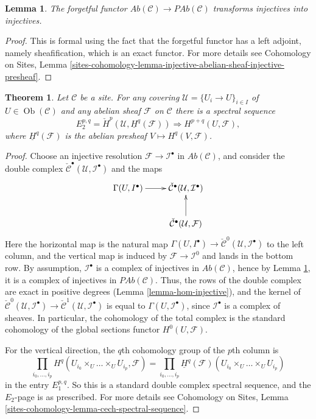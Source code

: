 \documentclass[10pt,a4paper]{amsart}
\theoremstyle{plain}
\newtheorem{theorem}[subsection]{Theorem}
\newtheorem{lemma}[subsection]{Lemma}
\theoremstyle{definition}
\theoremstyle{remark}
\numberwithin{equation}{subsection}
\def\Ob{\mathop{\mathrm{Ob}}\nolimits}
\begin{document}
\begin{lemma}
\label{lemma-forget-injectives}
The forgetful functor $\textit{Ab}(\mathcal{C})\to \textit{PAb}(\mathcal{C})$
transforms injectives into injectives.
\end{lemma}

\begin{proof}
This is formal using the fact that the forgetful functor has a left adjoint,
namely sheafification, which is an exact functor. For more details see
Cohomology on Sites,
Lemma \ref{sites-cohomology-lemma-injective-abelian-sheaf-injective-presheaf}.
\end{proof}

\begin{theorem}
\label{theorem-cech-ss}
Let $\mathcal{C}$ be a site. For any covering
$\mathcal{U} = \{U_i \to U\}_{i \in I}$ of $U \in \Ob(\mathcal{C})$
and any abelian sheaf $\mathcal{F}$ on $\mathcal{C}$
there is a spectral sequence
$$
E_2^{p, q}
=
\check H^p(\mathcal{U}, \underline{H}^q(\mathcal{F}))
\Rightarrow
H^{p+q}(U, \mathcal{F}),
$$
where $\underline{H}^q(\mathcal{F})$ is the abelian presheaf
$V \mapsto H^q(V, \mathcal{F})$.
\end{theorem}

\begin{proof}
Choose an injective resolution $\mathcal{F}\to \mathcal{I}^\bullet$ in
$\textit{Ab}(\mathcal{C})$, and consider the double complex
$\check{\mathcal{C}}^\bullet(\mathcal{U}, \mathcal{I}^\bullet)$
and the maps
$$
\xymatrix{
\Gamma(U, I^\bullet) \ar[r] &
\check{\mathcal{C}}^\bullet(\mathcal{U}, \mathcal{I}^\bullet) \\
& \check{\mathcal{C}}^\bullet(\mathcal{U}, \mathcal{F}) \ar[u]
}
$$
Here the horizontal map is the natural map
$\Gamma(U, I^\bullet) \to
\check{\mathcal{C}}^0(\mathcal{U}, \mathcal{I}^\bullet)$
to the left column, and the vertical map is induced by
$\mathcal{F}\to \mathcal{I}^0$ and lands in the bottom row.
By assumption, $\mathcal{I}^\bullet$ is a complex of injectives in
$\textit{Ab}(\mathcal{C})$, hence by
Lemma \ref{lemma-forget-injectives}, it is a complex of injectives in
$\textit{PAb}(\mathcal{C})$. Thus, the rows of the double complex are
exact in positive degrees (Lemma \ref{lemma-hom-injective}), and
the kernel of $\check{\mathcal{C}}^0(\mathcal{U}, \mathcal{I}^\bullet)
\to \check{\mathcal{C}}^1(\mathcal{U}, \mathcal{I}^\bullet)$
is equal to
$\Gamma(U, \mathcal{I}^\bullet)$, since $\mathcal{I}^\bullet$
is a complex of sheaves. In particular, the cohomology of the total complex
is the standard
cohomology of the global sections functor $H^0(U, \mathcal{F})$.

\medskip\noindent
For the vertical direction, the $q$th cohomology group of the $p$th column is
$$
\prod_{i_0, \ldots, i_p}
H^q(U_{i_0} \times_U \ldots \times_U U_{i_p}, \mathcal{F})
=
\prod_{i_0, \ldots, i_p}
\underline{H}^q(\mathcal{F})(U_{i_0} \times_U \ldots \times_U U_{i_p})
$$
in the entry $E_1^{p, q}$. So this is a standard double complex spectral
sequence, and the $E_2$-page is as prescribed. For more details see
Cohomology on Sites,
Lemma \ref{sites-cohomology-lemma-cech-spectral-sequence}.
\end{proof}
\end{document}

